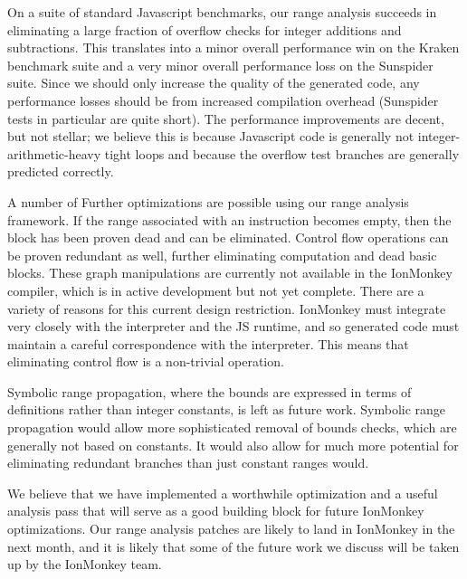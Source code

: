 \documentclass{article}
\begin{document}
On a suite of standard Javascript benchmarks, our range analysis
succeeds in eliminating a large fraction of overflow checks for
integer additions and subtractions. This translates into a minor
overall performance win on the Kraken benchmark suite and a very minor
overall performance loss on the Sunspider suite. Since we should only
increase the quality of the generated code, any performance losses
should be from increased compilation overhead (Sunspider tests in
particular are quite short). The performance improvements are decent,
but not stellar; we believe this is because Javascript code is
generally not integer-arithmetic-heavy tight loops and because the
overflow test branches are generally predicted correctly.

A number of Further optimizations are possible using our range analysis
framework. If the range associated with an instruction becomes empty, then the
block has been proven dead and can be eliminated. Control flow operations can
be proven redundant as well, further eliminating computation and dead basic
blocks. These graph manipulations are currently not available in the IonMonkey
compiler, which is in active development but not yet complete. There are a
variety of reasons for this current design restriction. IonMonkey must
integrate very closely with the interpreter and the JS runtime, and so
generated code must maintain a careful correspondence with the interpreter.
This means that eliminating control flow is a non-trivial
operation\cite{dvander}.

Symbolic range propagation, where the bounds are expressed in terms of
definitions rather than integer constants, is left as future
work. Symbolic range propagation would allow more sophisticated
removal of bounds checks, which are generally not based on
constants. It would also allow for much more potential for eliminating
redundant branches than just constant ranges would.

We believe that we have implemented a worthwhile optimization and a
useful analysis pass that will serve as a good building block for
future IonMonkey optimizations. Our range analysis patches are likely
to land in IonMonkey in the next month, and it is likely that some of
the future work we discuss will be taken up by the IonMonkey team.

{}

\end{document}
